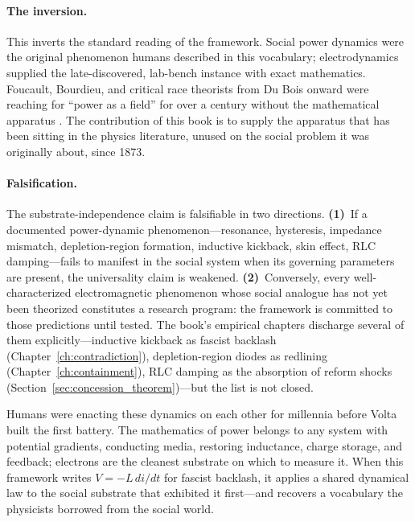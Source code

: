 \paragraph{The inversion.}
This inverts the standard reading of the framework. Social power
dynamics were the original phenomenon humans described in this
vocabulary; electrodynamics supplied the late-discovered, lab-bench
instance with exact mathematics. Foucault,
Bourdieu, and critical race theorists from Du Bois onward were reaching
for ``power as a field'' for over a century without the mathematical
apparatus \cite{foucault_discipline_punish, dubois}. The contribution
of this book is to supply the apparatus that has been sitting in the
physics literature, unused on the social problem it was originally
about, since 1873.

\paragraph{Falsification.}
The substrate-independence claim is falsifiable in two directions.
\textbf{(1)}~If a documented power-dynamic phenomenon---resonance,
hysteresis, impedance mismatch, depletion-region formation, inductive
kickback, skin effect, RLC damping---fails to manifest in the social
system when its governing parameters are present, the universality
claim is weakened. \textbf{(2)}~Conversely, every well-characterized
electromagnetic phenomenon whose social analogue has not yet been
theorized constitutes a research program: the framework is committed
to those predictions until tested. The book's empirical chapters
discharge several of them explicitly---inductive kickback as fascist
backlash (Chapter~\ref{ch:contradiction}), depletion-region diodes as
redlining (Chapter~\ref{ch:containment}), RLC damping as the absorption
of reform shocks (Section~\ref{sec:concession_theorem})---but the list
is not closed.

\begin{keyinsight}
Humans were enacting these dynamics on each other for millennia
before Volta built the first battery. The mathematics of power belongs
to any system with potential
gradients, conducting media, restoring inductance, charge storage, and
feedback; electrons are the cleanest substrate on which to measure it.
When this framework writes $V = -L\,di/dt$ for fascist backlash, it
applies a shared dynamical law to the social substrate that exhibited
it first---and recovers a vocabulary the physicists borrowed from the
social world.
\end{keyinsight}

